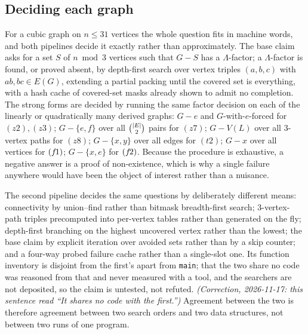 \documentclass[11pt]{amsart}
\newcommand{\Lam}{\Lambda}
\theoremstyle{plain}
\theoremstyle{definition}
\theoremstyle{remark}
\begin{document}
\subsection{Deciding each graph}\label{ssec:decide}
For a cubic graph on $n\le 31$ vertices the whole question fits in
machine words, and both pipelines decide it exactly rather than
approximately. The base claim asks for a set $S$ of $n \bmod 3$ vertices
such that $G-S$ has a $\Lam$-factor; a $\Lam$-factor is found, or proved
absent, by depth-first search over vertex triples $(a,b,c)$ with
$ab,bc\in E(G)$, extending a partial packing until the covered set is
everything, with a hash cache of covered-set masks already shown to
admit no completion. The strong forms are decided by running the same
factor decision on each of the linearly or quadratically many derived
graphs: $G-e$ and $G$-with-$e$-forced for $(z2),(z3)$; $G-\{e,f\}$ over
all $\tbinom{|E|}{2}$ pairs for $(z7)$; $G-V(L)$ over all $3$-vertex paths
for $(z8)$; $G-\{x,y\}$ over all edges for $(t2)$; $G-x$ over all
vertices for $(f\mkern-2mu1)$; $G-\{x,e\}$ for $(f\mkern-2mu2)$. Because the procedure is
exhaustive, a negative answer is a proof of non-existence, which is why a
single failure anywhere would have been the object of interest rather
than a nuisance.

The second pipeline decides the same questions by deliberately different
means: connectivity by union--find rather than bitmask breadth-first
search; $3$-vertex-path triples precomputed into per-vertex tables rather
than generated on the fly; depth-first branching on the highest uncovered
vertex rather than the lowest; the base claim by explicit iteration over
avoided sets rather than by a skip counter; and a four-way probed failure
cache rather than a single-slot one. Its function inventory is disjoint
from the first's apart from \texttt{main}; that the two share no code was
reasoned from that and never measured with a tool, and the searchers are
not deposited, so the claim is untested, not refuted. \emph{(Correction,
2026-11-17: this sentence read ``It shares no code with the first.'')}
Agreement between the two is therefore agreement between two search
orders and two data structures, not between two runs of one program.
\end{document}
